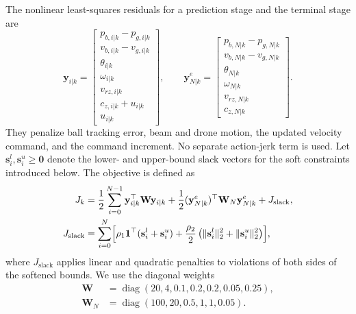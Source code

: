 \documentclass[letterpaper, 10 pt, conference]{ieeeconf}  %
\begin{document}
The nonlinear least-squares residuals for a prediction stage and the terminal stage are
\begin{equation}
    \mathbf y_{i|k}
    =\begin{bmatrix}
        p_{b,i|k}-p_{g,i|k}\\
        v_{b,i|k}-v_{g,i|k}\\
        \theta_{i|k}\\
        \omega_{i|k}\\
        v_{rz,i|k}\\
        c_{z,i|k}+u_{i|k}\\
        u_{i|k}
    \end{bmatrix},\qquad
    \mathbf y_{N|k}^{e}
    =\begin{bmatrix}
        p_{b,N|k}-p_{g,N|k}\\
        v_{b,N|k}-v_{g,N|k}\\
        \theta_{N|k}\\
        \omega_{N|k}\\
        v_{rz,N|k}\\
        c_{z,N|k}
    \end{bmatrix}.
    \label{eq:nmpc_tracking_residuals}
\end{equation}
They penalize ball tracking error, beam and drone motion, the updated velocity command, and the command increment.
No separate action-jerk term is used. Let $\mathbf s_i^l,\mathbf s_i^u\geq\mathbf 0$ denote the lower- and
upper-bound slack vectors for the soft constraints introduced below. The objective is defined as
\begin{equation}
\begin{aligned}
    J_k
    &=\frac{1}{2}\sum_{i=0}^{N-1}
    \mathbf y_{i|k}^{\top}\mathbf W\mathbf y_{i|k}+\frac{1}{2}(\mathbf y_{N|k}^{e})^{\top}
    \mathbf W_N\mathbf y_{N|k}^{e}+J_{\mathrm{slack}},\\
    J_{\mathrm{slack}}
    &=\sum_{i=0}^{N}\Bigl[
    \rho_1\mathbf 1^\top(\mathbf s_i^l+\mathbf s_i^u)+\frac{\rho_2}{2}\left(\lVert\mathbf s_i^l\rVert_2^2
    +\lVert\mathbf s_i^u\rVert_2^2\right)\Bigr],
\end{aligned}
    \label{eq:nmpc_tracking_objective}
\end{equation}
where $J_{\mathrm{slack}}$ applies linear and quadratic penalties to violations of both sides of the softened
bounds. We use the diagonal weights
\begin{equation}
\begin{aligned}
    \mathbf W&=\operatorname{diag}(20,4,0.1,0.2,0.2,0.05,0.25),\\
    \mathbf W_N&=\operatorname{diag}(100,20,0.5,1,1,0.05).
\end{aligned}
    \label{eq:nmpc_tracking_weights}
\end{equation}
\end{document}
